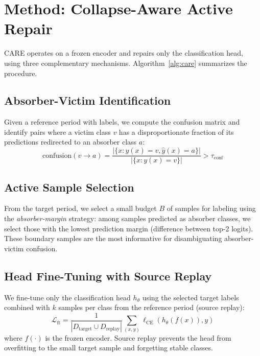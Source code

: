 \documentclass[journal]{IEEEtran}
\newcommand{\ours}{CARE}  %
\begin{document}
\section{Method: Collapse-Aware Active Repair}
\label{sec:method}

\ours{} operates on a frozen encoder and repairs only the classification head, using three complementary mechanisms.
Algorithm~\ref{alg:care} summarizes the procedure.

\subsection{Absorber-Victim Identification}

Given a reference period with labels, we compute the confusion matrix and identify pairs where a victim class $v$ has a disproportionate fraction of its predictions redirected to an absorber class $a$:
\begin{equation}
  \text{confusion}(v \to a) = \frac{|\{x : y(x)=v, \hat{y}(x)=a\}|}{|\{x : y(x)=v\}|} > \tau_{\text{conf}}
\end{equation}

\subsection{Active Sample Selection}

From the target period, we select a small budget $B$ of samples for labeling using the \textit{absorber-margin} strategy: among samples predicted as absorber classes, we select those with the lowest prediction margin (difference between top-2 logits).
These boundary samples are the most informative for disambiguating absorber-victim confusion.

\subsection{Head Fine-Tuning with Source Replay}

We fine-tune only the classification head $h_\theta$ using the selected target labels combined with $k$ samples per class from the reference period (source replay):
\begin{equation}
  \mathcal{L}_{\text{ft}} = \frac{1}{|D_{\text{target}} \cup D_{\text{replay}}|} \sum_{(x,y)} \ell_{\text{CE}}(h_\theta(f(x)), y)
\end{equation}
where $f(\cdot)$ is the frozen encoder.
Source replay prevents the head from overfitting to the small target sample and forgetting stable classes.
\end{document}
